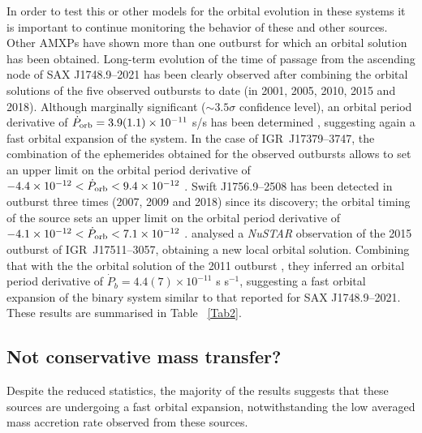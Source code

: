 \documentclass[graybox]{svmult}
\def \nustar{{\em NuSTAR\xspace}}
\begin{document}
In order to test this or other models for the orbital evolution in these systems it is important to continue monitoring the behavior of these and other sources. Other AMXPs have shown more than one outburst for which an orbital solution has been obtained. Long-term evolution of the time of passage from the ascending node of SAX J1748.9--2021 has been clearly observed after combining the orbital solutions of the five observed outbursts to date (in 2001, 2005, 2010, 2015 and 2018). Although marginally significant ($\sim 3.5 \sigma$ confidence level), an orbital period derivative of $\dot{P}_{\rm orb}=3.9(1.1)\times 10^{-11}$ s/s has been determined \cite{Sanna2020}, suggesting again a fast orbital expansion of the system. In the case of IGR~J17379--3747, the combination of the ephemerides obtained for the observed outbursts allows to set an upper limit on the orbital period derivative of $-4.4\times10^{-12} < \dot{P}_{\rm orb} < 9.4\times 10^{-12}$ \cite{Sanna2018b}. Swift J1756.9--2508 has been detected in outburst three times (2007, 2009 and 2018) since its discovery; the orbital timing of the source sets an upper limit on the orbital period derivative of $-4.1 \times 10^{-12} < \dot{P}_{\rm orb} < 7.1 \times 10^{-12}$ \cite{Sanna2019}. \cite{Riggio2020} analysed a \nustar{} observation of the 2015 outburst of IGR~J17511--3057, obtaining a new local orbital solution. Combining that with the the orbital solution of the 2011 outburst \cite{Riggio2011}, they inferred an orbital period derivative of $\dot{P}_b = 4.4(7) \times 10^{-11}$ s s$^{-1}$, suggesting a fast orbital expansion of the binary system similar to that reported for SAX J1748.9--2021. These results are summarised in Table ~\ref{Tab2}.

\subsection{Not conservative mass transfer?}

Despite the reduced statistics, the majority of the results suggests that these sources are undergoing a fast orbital expansion, notwithstanding the low averaged mass accretion rate observed from these sources.
\end{document}
